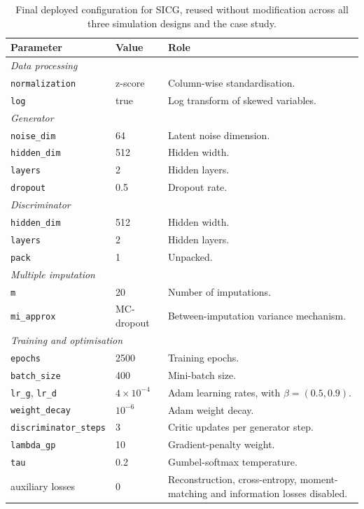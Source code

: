 \begin{table}[ht]
\centering
\caption{Final deployed configuration for SICG, reused without modification across all three simulation designs and the case study.}
\label{tab:config_sicg}
\begin{tabularx}{\textwidth}{ll>{\raggedright\arraybackslash}X}
\toprule
Parameter & Value & Role \\
\midrule
\multicolumn{3}{l}{\textit{Data processing}} \\
\texttt{normalization} & z-score & Column-wise standardisation. \\
\texttt{log} & true & Log transform of skewed variables. \\
\midrule
\multicolumn{3}{l}{\textit{Generator}} \\
\texttt{noise\_dim} & 64 & Latent noise dimension. \\
\texttt{hidden\_dim} & 512 & Hidden width. \\
\texttt{layers} & 2 & Hidden layers. \\
\texttt{dropout} & 0.5 & Dropout rate. \\
\midrule
\multicolumn{3}{l}{\textit{Discriminator}} \\
\texttt{hidden\_dim} & 512 & Hidden width. \\
\texttt{layers} & 2 & Hidden layers. \\
\texttt{pack} & 1 & Unpacked. \\
\midrule
\multicolumn{3}{l}{\textit{Multiple imputation}} \\
\texttt{m} & 20 & Number of imputations. \\
\texttt{mi\_approx} & MC-dropout & Between-imputation variance mechanism. \\
\midrule
\multicolumn{3}{l}{\textit{Training and optimisation}} \\
\texttt{epochs} & 2500 & Training epochs. \\
\texttt{batch\_size} & 400 & Mini-batch size. \\
\texttt{lr\_g}, \texttt{lr\_d} & $4 \times 10^{-4}$ &
    Adam learning rates, with $\beta = (0.5, 0.9)$. \\
\texttt{weight\_decay} & $10^{-6}$ & Adam weight decay. \\
\texttt{discriminator\_steps} & 3 & Critic updates per generator step. \\
\texttt{lambda\_gp} & 10 & Gradient-penalty weight. \\
\texttt{tau} & 0.2 & Gumbel-softmax temperature. \\
auxiliary losses & 0 &
    Reconstruction, cross-entropy, moment-matching and information losses disabled. \\
\bottomrule
\end{tabularx}
\end{table}

